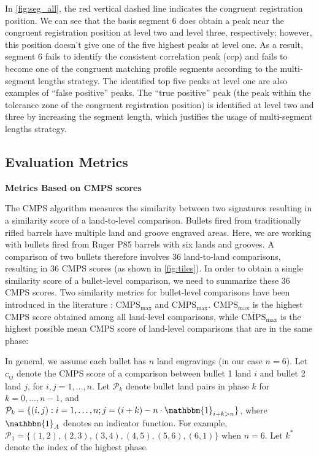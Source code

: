 In \autoref{fig:seg_all}, the red vertical dashed line indicates the
congruent registration position. We can see that the basis segment 6
does obtain a peak near the congruent registration position at level two
and level three, respectively; however, this position doesn't give one
of the five highest peaks at level one. As a result, segment 6 fails to
identify the consistent correlation peak (ccp) and fails to become one
of the congruent matching profile segments according to the
multi-segment lengths strategy. The identified top five peaks at level
one are also examples of ``false positive'' peaks. The ``true positive''
peak (the peak within the tolerance zone of the congruent registration
position) is identified at level two and three by increasing the segment
length, which justifies the usage of multi-segment lengths strategy.

\hypertarget{evaluation-metrics}{%
\subsection{Evaluation Metrics}\label{evaluation-metrics}}

\textbf{Metrics Based on CMPS scores}

The CMPS algorithm measures the similarity between two signatures
resulting in a similarity score of a land-to-level comparison. Bullets
fired from traditionally rifled barrels have multiple land and groove
engraved areas. Here, we are working with bullets fired from Ruger P85
barrels with six lands and grooves. A comparison of two bullets
therefore involves 36 land-to-land comparisons, resulting in 36 CMPS
scores (as shown in \autoref{fig:tiles}). In order to obtain a single
similarity score of a bullet-level comparison, we need to summarize
these 36 CMPS scores. Two similarity metrics for bullet-level
comparisons have been introduced in the literature \citep{cmps}:
\(\mathrm{CMPS_{max}}\) and \(\mathrm{\overline{CMPS}_{max}}\).
\(\mathrm{CMPS_{max}}\) is the highest CMPS score obtained among all
land-level comparisons, while \(\mathrm{\overline{CMPS}_{max}}\) is the
highest possible mean CMPS score of land-level comparisons that are in
the same phase:

In general, we assume each bullet has \(n\) land engravings (in our case
\(n=6\)). Let \(c_{ij}\) denote the CMPS score of a comparison between
bullet 1 land \(i\) and bullet 2 land \(j\), for \(i,j = 1, \dots, n\).
Let \(\mathcal{P}_k\) denote bullet land pairs in phase \(k\) for
\(k = 0, \dots, n-1\), and
\(\mathcal{P}_k = \{ (i,j): i = 1, \dots, n ; j = (i + k) - n \cdot \mathbbm{1}_{i + k > n} \}\),
where \(\mathbbm{1}_A\) denotes an indicator function. For example,
\(\mathcal{P}_1 = \{ (1,2), (2,3), (3,4), (4,5), (5,6), (6,1) \}\) when
\(n = 6\). Let \(k^*\) denote the index of the highest phase.

